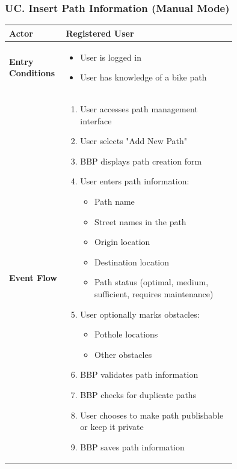 \subsubsection*{UC\cuc . Insert Path Information (Manual Mode)}
\begin{center}
    \begin{longtable}{|l|p{0.75\linewidth}|}
        \hline
        \textbf{Actor}            & Registered User \\
        \hline
        \textbf{Entry Conditions} & 
        \begin{itemize}
            \item User is logged in
            \item User has knowledge of a bike path
        \end{itemize} \\
        \hline
        \textbf{Event Flow}       & 
        \begin{enumerate}
            \item User accesses path management interface
            \item User selects "Add New Path"
            \item BBP displays path creation form
            \item User enters path information:
            \begin{itemize}
                \item Path name
                \item Street names in the path
                \item Origin location
                \item Destination location
                \item Path status (optimal, medium, sufficient, requires maintenance)
            \end{itemize}
            \item User optionally marks obstacles:
            \begin{itemize}
                \item Pothole locations
                \item Other obstacles
            \end{itemize}
            \item BBP validates path information
            \item BBP checks for duplicate paths
            \item User chooses to make path publishable or keep it private
            \item BBP saves path information

\end{enumerate}
\end{longtable}
\end{center}
